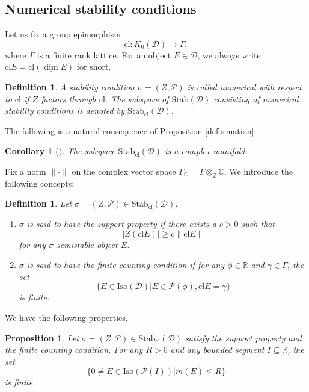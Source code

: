 \documentclass[a4paper,12pt]{amsart}
\numberwithin{equation}{section}
\newtheorem{definition}[theorem]{Definition}
\newtheorem{proposition}[theorem]{Proposition}
\newtheorem{corollary}[theorem]{Corollary}
\newcommand{\Stab}{\mathrm{Stab}}
\newcommand{\udv}{\underline{\dim}}
\newcommand{\Iso}{\mathrm{Iso}}
\newcommand{\cl}{\mathrm{cl}}
\newcommand{\1}{\mathbf{1}}
\begin{document}
\subsection{Numerical stability conditions}
Let us fix a group epimorphism
\[\cl:K_0(\mathcal{D})\rightarrow\Gamma,\]
where $\Gamma$ is a finite rank lattice. For an object $E\in\mathcal{D}$, we always write $\cl E=\cl(\udv E)$ for short.
\begin{definition}
    A stability condition $\sigma=(Z,\mathcal{P})$ is called \emph{numerical} with respect to $\cl$ if $Z$ factors through $\cl$. The subspace of $\Stab(\mathcal{D})$ consisting of numerical stability conditions is denoted by $\Stab_\cl(\mathcal{D})$.
\end{definition}
The following is a natural consequence of Proposition \ref{deformation}.
\begin{corollary}[{\cite[Corollary 1.3]{Bri2007}}]
    The subspace $\Stab_\cl(\mathcal{D})$ is a complex manifold.
\end{corollary}
Fix a norm $\|\cdot\|$ on the complex vector space $\Gamma_{\mathbb{C}}=\Gamma\otimes_{\mathbb{Z}}\mathbb{C}$. We introduce the following concepts:
\begin{definition} Let $\sigma=(Z,\mathcal{P})\in\Stab_\cl(\mathcal{D})$.
    \begin{enumerate}
        \item $\sigma$ is said to have the \emph{support property} if there exists a $c>0$ such that
        \[|Z(\cl E)|\geqslant c\|\cl E\|\]
        for any $\sigma$-semistable object $E$.
        \item $\sigma$ is said to have the \emph{finite counting condition} if for any $\phi\in\mathbb{R}$ and $\gamma\in\Gamma$, the set
    \[\{E\in\Iso(\mathcal{D})|E\in\mathcal{P}(\phi),\cl E=\gamma\}\]
    is finite.
    \end{enumerate}
\end{definition}
We have the following properties.
\begin{proposition}\label{mass and phase bounds finite}
    Let $\sigma=(Z,\mathcal{P})\in\Stab_\cl(\mathcal{D})$ satisfy the support property and the finite counting condition. For any $R>0$ and any bounded segment $I\subseteq\mathbb{R}$, the set
    \[\{0\neq E\in\Iso(\mathcal{P}(I))|m(E)\leqslant R\}\]
    is finite.
\end{proposition}
\end{document}
